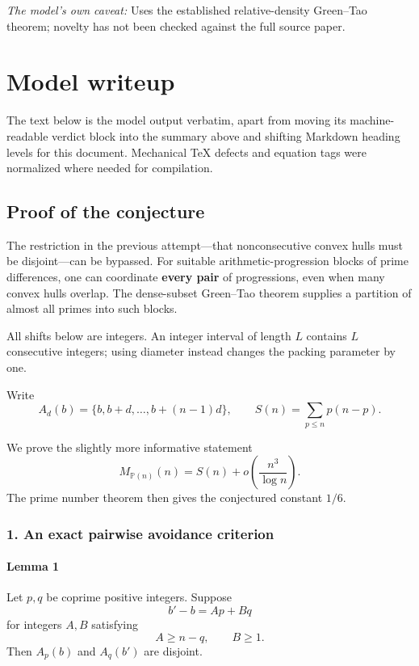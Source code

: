 \documentclass[
  11pt,
  a4paper,
]{article}
\begin{document}
\emph{The model's own caveat:} Uses the established relative-density
Green--Tao theorem; novelty has not been checked against the full source
paper.

\section{Model writeup}\label{model-writeup}

The text below is the model output verbatim, apart from moving its
machine-readable verdict block into the summary above and shifting
Markdown heading levels for this document. Mechanical TeX defects and
equation tags were normalized where needed for compilation.

\subsection{Proof of the conjecture}\label{proof-of-the-conjecture}

The restriction in the previous attempt---that nonconsecutive convex
hulls must be disjoint---can be bypassed. For suitable
arithmetic-progression blocks of prime differences, one can coordinate
\textbf{every pair} of progressions, even when many convex hulls
overlap. The dense-subset Green--Tao theorem supplies a partition of
almost all primes into such blocks.

All shifts below are integers. An integer interval of length \(L\)
contains \(L\) consecutive integers; using diameter instead changes the
packing parameter by one.

Write \[
A_d(b)=\{b,b+d,\ldots,b+(n-1)d\},
\qquad
S(n)=\sum_{p\le n}p(n-p).
\]

We prove the slightly more informative statement \[
\boxed{\;
M_{\mathbb P(n)}(n)
=
S(n)+o\!\left(\frac{n^3}{\log n}\right).
\;}
\] The prime number theorem then gives the conjectured constant \(1/6\).

\subsubsection{1. An exact pairwise avoidance
criterion}\label{an-exact-pairwise-avoidance-criterion}

\paragraph{Lemma 1}\label{lemma-1}

Let \(p,q\) be coprime positive integers. Suppose \[
b'-b=Ap+Bq
\] for integers \(A,B\) satisfying \[
A\ge n-q,\qquad B\ge1.
\] Then \(A_p(b)\) and \(A_q(b')\) are disjoint.
\end{document}
